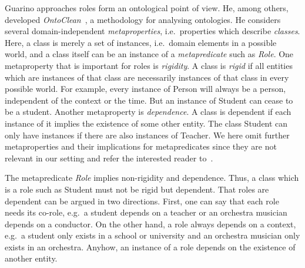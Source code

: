 Guarino approaches roles form an ontological point of view. He, among others, developed
\emph{OntoClean}~\cite{GuW-HoO09}, a methodology for analysing ontologies. He considers several
domain-independent \emph{metaproperties}, i.e.\ properties which describe \emph{classes}. Here, a
class is merely a set of instances, i.e.\ domain elements in a possible world, and a class itself
can be an instance of a \emph{metapredicate} such as \emph{Role}.
%
One metaproperty that is important for roles is \emph{rigidity}. A class is \emph{rigid} if all
entities which are instances of that class are necessarily instances of that class in every possible
world. For example, every instance of Person will always be a person, independent of the context or
the time. But an instance of Student can cease to be a student.
%
Another metaproperty is \emph{dependence}.  A class is dependent if each instance of it implies the
existence of some other entity. The class Student can only have instances if there are also
instances of Teacher.
%
We here omit further metaproperties and their implications for metapredicates since they are not
relevant in our setting and refer the interested reader
to~\cite{GuW-EKAW00,GuW00,GuW-CM00,WeG-DKE01}.

The metapredicate \emph{Role} implies non-rigidity and dependence. Thus, a class which is a
role such as Student must not be rigid but dependent. That roles are dependent can be argued in two
directions. First, one can say that each role needs its co-role, e.g.\ a student depends on a teacher
or an orchestra musician depends on a conductor. On the other hand, a role always depends on a
context, e.g.\ a student only exists in a school or university and an orchestra musician only exists
in an orchestra.  Anyhow, an instance of a role depends on the existence of another entity.

